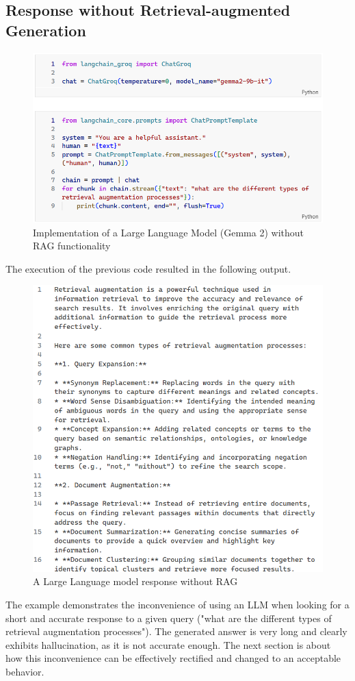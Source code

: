 \subsection{Response without Retrieval-augmented Generation}
\begin{figure}[htbp]
    \centering
    \includegraphics[width=\linewidth]{./figures/code-norag.png}
    \caption{Implementation of a Large Language Model (Gemma 2) without RAG functionality}
\end{figure}\newpage
The execution of the previous code resulted in the following output.
\begin{figure}[htbp]
    \centering
    \includegraphics[width=\linewidth]{./figures/answer_norag.png}
    \caption{A Large Language model response without RAG}
\end{figure}\newline
The example demonstrates the inconvenience of using an LLM when looking for a short and accurate response to a given query ("what are the different types of retrieval augmentation processes"). The generated answer is very long and clearly exhibits hallucination, as it is not accurate enough.\newline
The next section is about how this inconvenience can be effectively rectified and changed to an acceptable behavior.\newpage
